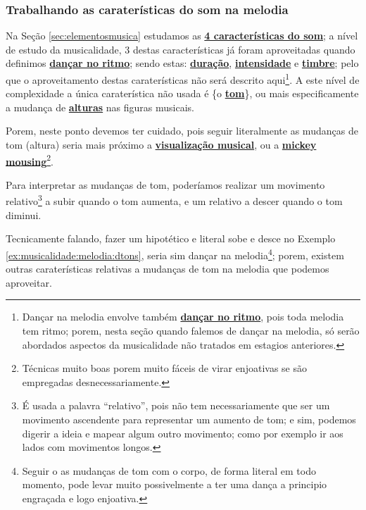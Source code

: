 \subsubsection{Trabalhando as caraterísticas do som na melodia} 
Na 
Seção \ref{sec:elementosmusica} estudamos as \hyperref[sec:carateristasom]{\textbf{4 características do som}};
a nível de estudo da musicalidade, 
3 destas características já foram aproveitadas quando definimos \hyperref[subsec:dancaritmo]{\textbf{dançar no ritmo}};
sendo estas: 
\hyperref[sec:pos:Duracion]{\textbf{duração}}, 
\hyperref[sec:pos:Intensidade]{\textbf{intensidade}} e 
\hyperref[sec:pos:timbre]{\textbf{timbre}};
pelo que o aproveitamento destas caraterísticas não será descrito aqui\footnote{\label{footn:melodiatemritmo}Dançar 
na melodia envolve também \hyperref[subsec:dancaritmo]{\textbf{dançar no ritmo}}, 
pois toda melodia tem ritmo; 
porem, nesta seção quando falemos de dançar na melodia, 
só serão abordados aspectos da musicalidade não tratados em estagios anteriores.}.
A este nível de complexidade a única caraterística não usada é 
\{o \hyperref[sec:pos:Altura]{\textbf{tom}}\},
ou mais especificamente a mudança de \hyperref[sec:pos:Altura]{\textbf{alturas}} nas figuras musicais.

Porem, neste ponto devemos ter cuidado, 
pois seguir literalmente as mudanças de tom (altura)
seria mais próximo a \hyperref[subsubsec:musicvisualization]{\textbf{visualização musical}},
 ou a \hyperref[sec:mikeymousing]{\textbf{mickey mousing}}\footnote{Técnicas 
muito boas porem muito fáceis de virar enjoativas se são empregadas desnecessariamente.}.


\begin{example} 
\label{ex:musicalidade:melodia:dtons}
Para interpretar as mudanças de tom, 
poderíamos realizar um movimento relativo\footnote{É usada a palavra ``relativo'',
pois não tem necessariamente que ser um movimento ascendente para representar um aumento de tom;
e sim, podemos digerir a ideia e mapear algum outro movimento; 
como por exemplo ir aos lados com movimentos longos.} 
a subir quando o tom aumenta,
e um relativo a descer quando o tom diminui.
\end{example}

Tecnicamente falando, 
fazer um hipotético e literal sobe e desce no Exemplo \ref{ex:musicalidade:melodia:dtons}, 
seria sim dançar na melodia\footnote{Seguir o as mudanças de tom com o corpo, 
de forma literal em todo momento, 
pode levar muito possivelmente a ter uma dança a principio engraçada e logo enjoativa.};
porem, 
existem outras caraterísticas relativas a mudanças de tom na melodia que podemos aproveitar. 


